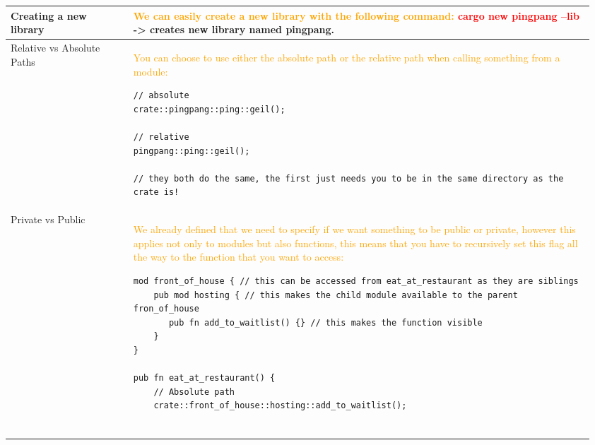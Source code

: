 \documentclass[main.tex,fontsize=8pt,paper=a4,paper=portrait,DIV=calc,]{scrartcl}
\begin{document}
\begin{table}[ht!]
\begin{tabular}{|m{0.2\linewidth}|m{0.755\linewidth}|}
\hline
Creating a new library & 
\textcolor{orange}{We can easily create a new library with the following command:}\newline
\textcolor{red}{\textbf{cargo new pingpang --lib}} -> creates new library named pingpang.\\
\hline
Relative vs Absolute Paths & 
\textcolor{orange}{You can choose to use either the absolute path or the relative path when calling something from a module:}\newline
\begin{lstlisting}
// absolute
crate::pingpang::ping::geil();

// relative 
pingpang::ping::geil();

// they both do the same, the first just needs you to be in the same directory as the crate is!
\end{lstlisting}\\
\hline
Private vs Public & 
\textcolor{orange}{We already defined that we need to specify if we want something to be public or private,
however this applies not only to modules but also functions, this means that you have to recursively set this flag all the way to the function that you want to access:}
\begin{lstlisting}
mod front_of_house { // this can be accessed from eat_at_restaurant as they are siblings
    pub mod hosting { // this makes the child module available to the parent fron_of_house
       pub fn add_to_waitlist() {} // this makes the function visible
    }
}

pub fn eat_at_restaurant() {
    // Absolute path
    crate::front_of_house::hosting::add_to_waitlist();


\end{lstlisting}
\end{tabular}
\end{table}
\end{document}
